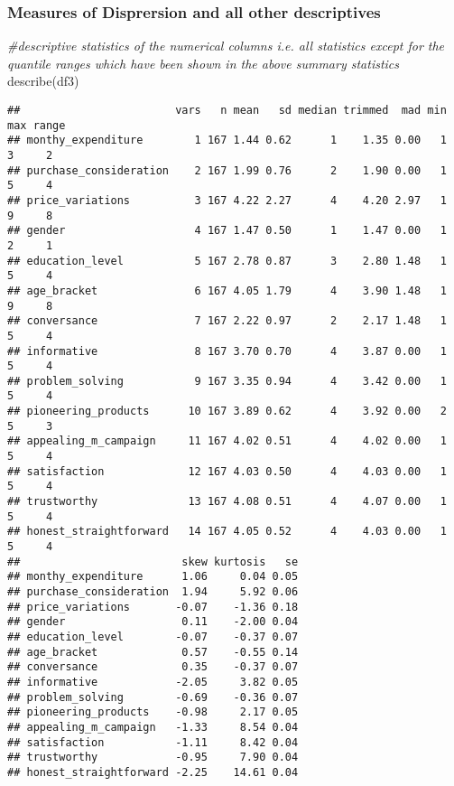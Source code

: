 \documentclass[
]{article}
\newenvironment{Shaded}{\begin{snugshade}}{\end{snugshade}}
\newcommand{\CommentTok}[1]{\textcolor[rgb]{0.56,0.35,0.01}{\textit{#1}}}
\newcommand{\FunctionTok}[1]{\textcolor[rgb]{0.00,0.00,0.00}{#1}}
\newcommand{\NormalTok}[1]{#1}
\begin{document}
\hypertarget{measures-of-disprersion-and-all-other-descriptives}{%
\subsubsection{Measures of Disprersion and all other
descriptives}\label{measures-of-disprersion-and-all-other-descriptives}}

\begin{Shaded}
\begin{Highlighting}[]
\CommentTok{\#descriptive statistics of the numerical columns i.e. all statistics except for the quantile ranges which have been shown in the above summary statistics}
\FunctionTok{describe}\NormalTok{(df3)}
\end{Highlighting}
\end{Shaded}

\begin{verbatim}
##                        vars   n mean   sd median trimmed  mad min max range
## monthy_expenditure        1 167 1.44 0.62      1    1.35 0.00   1   3     2
## purchase_consideration    2 167 1.99 0.76      2    1.90 0.00   1   5     4
## price_variations          3 167 4.22 2.27      4    4.20 2.97   1   9     8
## gender                    4 167 1.47 0.50      1    1.47 0.00   1   2     1
## education_level           5 167 2.78 0.87      3    2.80 1.48   1   5     4
## age_bracket               6 167 4.05 1.79      4    3.90 1.48   1   9     8
## conversance               7 167 2.22 0.97      2    2.17 1.48   1   5     4
## informative               8 167 3.70 0.70      4    3.87 0.00   1   5     4
## problem_solving           9 167 3.35 0.94      4    3.42 0.00   1   5     4
## pioneering_products      10 167 3.89 0.62      4    3.92 0.00   2   5     3
## appealing_m_campaign     11 167 4.02 0.51      4    4.02 0.00   1   5     4
## satisfaction             12 167 4.03 0.50      4    4.03 0.00   1   5     4
## trustworthy              13 167 4.08 0.51      4    4.07 0.00   1   5     4
## honest_straightforward   14 167 4.05 0.52      4    4.03 0.00   1   5     4
##                         skew kurtosis   se
## monthy_expenditure      1.06     0.04 0.05
## purchase_consideration  1.94     5.92 0.06
## price_variations       -0.07    -1.36 0.18
## gender                  0.11    -2.00 0.04
## education_level        -0.07    -0.37 0.07
## age_bracket             0.57    -0.55 0.14
## conversance             0.35    -0.37 0.07
## informative            -2.05     3.82 0.05
## problem_solving        -0.69    -0.36 0.07
## pioneering_products    -0.98     2.17 0.05
## appealing_m_campaign   -1.33     8.54 0.04
## satisfaction           -1.11     8.42 0.04
## trustworthy            -0.95     7.90 0.04
## honest_straightforward -2.25    14.61 0.04
\end{verbatim}
\end{document}
